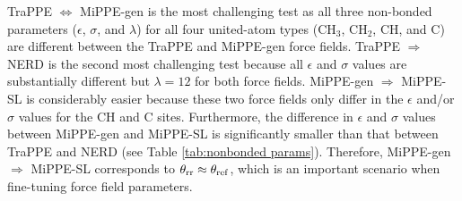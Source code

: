 \documentclass[journal=jced,manuscript=article]{achemso}
\begin{document}
TraPPE $\Leftrightarrow$ MiPPE-gen is the most challenging test as all three non-bonded parameters ($\epsilon$, $\sigma$, and $\lambda$) for all four united-atom types (CH$_3$, CH$_2$, CH, and C) are different between the TraPPE and MiPPE-gen force fields. TraPPE $\Rightarrow$ NERD is the second most challenging test because all $\epsilon$ and $\sigma$ values are substantially different but $\lambda = 12$ for both force fields. MiPPE-gen $\Rightarrow$ MiPPE-SL is considerably easier because these two force fields only differ in the $\epsilon$ and/or $\sigma$ values for the CH and C sites. Furthermore, the difference in $\epsilon$ and $\sigma$ values between MiPPE-gen and MiPPE-SL is significantly smaller than that between TraPPE and NERD (see Table \ref{tab:nonbonded params}). Therefore, MiPPE-gen $\Rightarrow$ MiPPE-SL corresponds to $\theta_{\rm rr} \approx \theta_{\rm ref}$, which is an important scenario when fine-tuning force field parameters.



\end{document}
